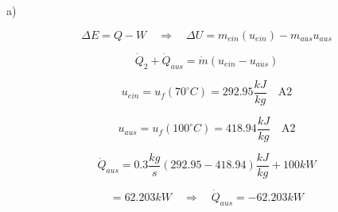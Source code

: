 a)

\[
\Delta E = Q - W \quad \Rightarrow \quad \Delta U = m_{ein}(u_{ein}) - m_{aus} u_{aus}
\]

\[
\dot{Q}_2 + \dot{Q}_{aus} = \dot{m}(u_{ein} - u_{aus})
\]

\[
u_{ein} = u_f(70^\circ C) = 292.95 \frac{kJ}{kg} \quad \text{A2}
\]

\[
u_{aus} = u_f(100^\circ C) = 418.94 \frac{kJ}{kg} \quad \text{A2}
\]

\[
\dot{Q}_{aus} = 0.3 \frac{kg}{s} (292.95 - 418.94) \frac{kJ}{kg} + 100 kW
\]

\[
= 62.203 kW \quad \Rightarrow \quad \dot{Q}_{aus} = -62.203 kW
\]